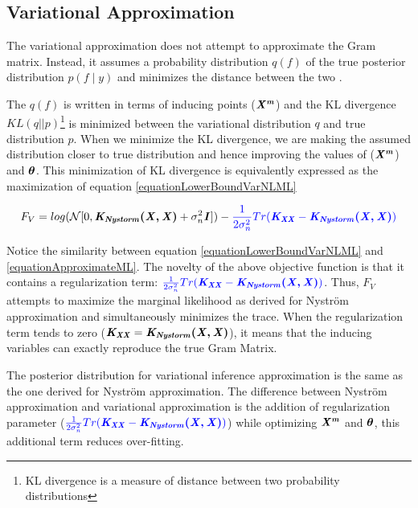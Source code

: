 \subsection{Variational Approximation}\label{subSecVariationalApprox} 
The variational approximation does not attempt to approximate the Gram matrix. Instead, it assumes a probability distribution $q(f)$ of the true posterior distribution $p(f \mid y)$ and minimizes the distance between the two \cite{Titsias09variationallearning}. 

The $q(f)$ is written in terms of inducing points ($\bm{\mathit{X^{m}}}$) and the KL divergence $KL(q||p)$\footnote{KL divergence is a measure of distance between two probability distributions} is minimized between the variational distribution $q$ and true distribution $p$. When we minimize the KL divergence, we are making the assumed distribution closer to true distribution and hence improving the values of ($\bm{\mathit{X^{m}}}$) and $\boldsymbol{\theta} $. This minimization of KL divergence is equivalently expressed as the maximization of equation \ref{equationLowerBoundVarNLML}

\begin{equation}\label{equationLowerBoundVarNLML}
F_{V} = log(\mathcal{N}[0, \bm{\mathit{K_{Nystorm}(X, X)}} + \sigma_{n}^{2}\bm{\mathit{I}} ]) - \textcolor{blue}{\frac{1}{2\sigma_{n}^{2}}Tr(\bm{\mathit{K_{XX}}} - \bm{\mathit{K_{Nystorm}(X, X)}})}
\end{equation}

Notice the similarity between equation \ref{equationLowerBoundVarNLML} and \ref{equationApproximateML}. The novelty of the above objective function is that it contains a regularization term: $\textcolor{blue}{\frac{1}{2\sigma_{n}^{2}}Tr(\bm{\mathit{K_{XX}}} - \bm{\mathit{K_{Nystorm}(X, X)}})}$. Thus, $F_{V}$ attempts to maximize the marginal likelihood as derived for Nystr\"{o}m approximation and simultaneously minimizes the trace. When the regularization term tends to zero ($\bm{\mathit{K_{XX}}} = \bm{\mathit{K_{Nystorm}(X, X)}}$), it means that the inducing variables can exactly reproduce the true Gram Matrix. 

\sloppy The posterior distribution for variational inference approximation is the same as the one derived for Nystr\"{o}m approximation. The difference between Nystr\"{o}m approximation and variational approximation is the addition of regularization parameter ($\textcolor{blue}{\frac{1}{2\sigma_{n}^{2}}Tr(\bm{\mathit{K_{XX}}} - \bm{\mathit{K_{Nystorm}(X, X)}})}$) while optimizing $\bm{\mathit{X^{m}}}$ and $\boldsymbol{\theta}$, this additional term reduces over-fitting.

